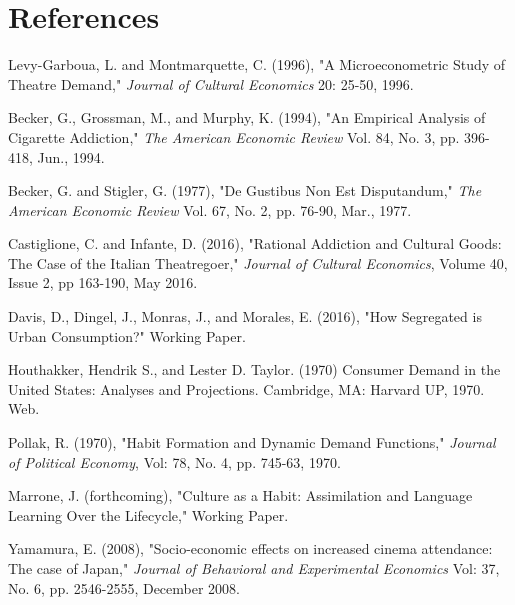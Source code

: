 \documentclass[Journal,letterpaper, NoLineNumbers]{ascelike-new}
\begin{document}
\section{References}

Levy-Garboua, L. and Montmarquette, C. (1996), "A Microeconometric Study of Theatre Demand," \textit{Journal of Cultural Economics} 20: 25-50, 1996.

Becker, G., Grossman, M., and Murphy, K. (1994), "An Empirical Analysis of Cigarette Addiction," \textit{The American Economic Review} Vol. 84, No. 3, pp. 396-418, Jun., 1994.

Becker, G. and Stigler, G. (1977), "De Gustibus Non Est Disputandum," \textit{The American Economic Review} Vol. 67, No. 2, pp. 76-90, Mar., 1977.

Castiglione, C. and Infante, D. (2016), "Rational Addiction and Cultural Goods: The Case of the Italian Theatregoer," \textit{Journal of Cultural Economics}, Volume 40, Issue 2, pp 163-190,  May 2016. 

Davis, D., Dingel, J., Monras, J., and Morales, E. (2016), "How Segregated is Urban Consumption?" Working Paper.

Houthakker, Hendrik S., and Lester D. Taylor. (1970) Consumer Demand in the United States: Analyses and Projections. Cambridge, MA: Harvard UP, 1970. Web.

Pollak, R. (1970), "Habit Formation and Dynamic Demand Functions," \textit{Journal of Political Economy}, Vol: 78, No. 4, pp. 745-63, 1970.

Marrone, J. (forthcoming), "Culture as a Habit: Assimilation and Language
Learning Over the Lifecycle," Working Paper.

Yamamura, E. (2008), "Socio-economic effects on increased cinema attendance: The case of Japan," \textit{Journal of Behavioral and Experimental Economics} Vol: 37, No. 6, pp. 2546-2555, December 2008. 
 
\end{document}
